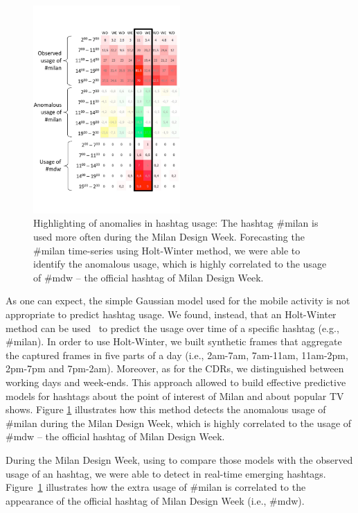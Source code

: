 \begin{figure}[h]
\begin{center}
\includegraphics[width=0.5\textwidth]{img/mdw-ht-usage} 
\caption{Highlighting of anomalies in hashtag usage: The hashtag \#milan is used more often during the Milan Design Week.
Forecasting the \#milan time-series using Holt-Winter method, we were able
to identify the anomalous usage, which is highly correlated to the usage
of \#mdw -- the official hashtag of Milan Design Week. }
\label{fig:L}
\end{center}
\end{figure}

As one can expect, the simple Gaussian model used for the mobile activity is not appropriate to predict hashtag usage. We found, instead, that an Holt-Winter method can be used~\cite{kalekar2004time} to predict the usage over time of a specific hashtag (e.g., \#milan). In order to use Holt-Winter, we built synthetic frames that aggregate the captured frames in five parts of a day (i.e., 2am-7am, 7am-11am, 11am-2pm, 2pm-7pm and 7pm-2am). Moreover, as for the CDRs, we distinguished between working days and week-ends. This approach allowed to build effective predictive models for hashtags about the point of interest of Milan and about popular TV shows. Figure \ref{fig:L} illustrates how this method detects the anomalous usage of \#milan during the Milan Design Week, which is highly correlated to the usage of  \#mdw -- the official hashtag of Milan Design Week.

During the Milan Design Week, using \sti{} to compare those models with the observed usage of an hashtag, we were able to detect in real-time emerging hashtags. Figure~\ref{fig:L} illustrates how the extra usage of \#milan is correlated to the appearance of the official hashtag of Milan Design Week (i.e., \#mdw).

